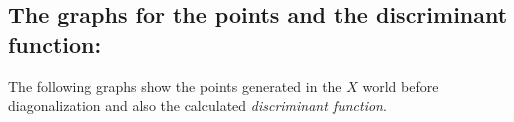 \documentclass[11pt, oneside]{article}   	%
\begin{document}
\subsection{The graphs for the points and the discriminant function:}
The following graphs show the points generated in the $X$ world before diagonalization and also the calculated \textit{discriminant function}.
\newpage
%
\end{document}
